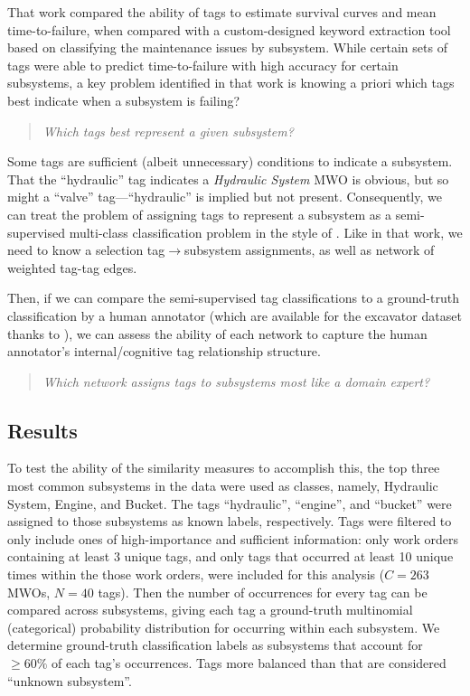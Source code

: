 \documentclass[%
	12pt,
		oneside,
		letterpaper
]{book}
\begin{document}
That work compared the ability of tags to estimate survival curves and
mean time-to-failure, when compared with a custom-designed keyword
extraction tool based on classifying the maintenance issues by
subsystem. While certain sets of tags were able to predict
time-to-failure with high accuracy for certain subsystems, a key problem
identified in that work is knowing a priori which tags best indicate
when a subsystem is failing?

\begin{quote}
\emph{Which tags best represent a given subsystem?}
\end{quote}

Some tags are sufficient (albeit unnecessary) conditions to indicate a
subsystem. That the ``hydraulic'' tag indicates a \emph{Hydraulic
System} MWO is obvious, but so might a ``valve'' tag---``hydraulic'' is
implied but not present. Consequently, we can treat the problem of
assigning tags to represent a subsystem as a semi-supervised multi-class
classification problem in the style of
\textcite{Semisupervisedlearning_Avrachenkov2017}. Like in that work, we
need to know a selection tag\(\rightarrow\)subsystem assignments, as
well as network of weighted tag-tag edges.

Then, if we can compare the semi-supervised tag classifications to a
ground-truth classification by a human annotator (which are available
for the excavator dataset thanks to
\textcite{sharedreliabilitydatabase_Ho2015}), we can assess the ability
of each network to capture the human annotator's internal/cognitive tag
relationship structure.

\begin{quote}
\emph{Which network assigns tags to subsystems most like a domain
expert?}
\end{quote}

\subsection{Results}\label{results}

To test the ability of the similarity measures to accomplish this, the
top three most common subsystems in the data were used as classes,
namely, Hydraulic System, Engine, and Bucket. The tags ``hydraulic'',
``engine'', and ``bucket'' were assigned to those subsystems as known
labels, respectively. Tags were filtered to only include ones of
high-importance and sufficient information: only work orders containing
at least 3 unique tags, and only tags that occurred at least 10 unique
times within the those work orders, were included for this analysis
(\(C=263\) MWOs, \(N=40\) tags). Then the number of occurrences for
every tag can be compared across subsystems, giving each tag a
ground-truth multinomial (categorical) probability distribution for
occurring within each subsystem. We determine ground-truth
classification labels as subsystems that account for \(\geq60\%\) of
each tag's occurrences. Tags more balanced than that are considered
``unknown subsystem''.
\end{document}
